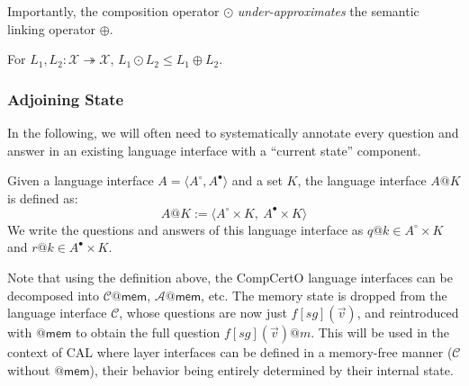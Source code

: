 \documentclass[acmsmall,screen,review,anonymous]{acmart}
\newcommand{\kw}[1]{\ensuremath{ \mathsf{#1} }}
\newcommand{\que}{\circ}
\newcommand{\ans}{\bullet}
\begin{document}
Importantly,
the composition operator $\odot$
\emph{under-approximates}
the semantic linking operator $\oplus$.

\begin{theorem}
For $L_1, L_2 : \mathcal{X} \twoheadrightarrow \mathcal{X}$,
$
  L_1 \odot L_2
  \le
  L_1 \oplus L_2
$.
\end{theorem}


\subsubsection{Adjoining State} %

In the following,
we will often need to systematically
annotate every question and answer
in an existing language interface
with a ``current state'' component.

\begin{definition}
Given a language interface $A = \langle A^\que, A^\ans \rangle$
and a set $K$,
the language interface $A@K$ is defined as:
\[
  A@K := \langle A^\que \times K ,\: A^\ans \times K \rangle
\]
We write the questions and answers of this language interface as
$q@k \in A^\que \times K$ and
$r@k \in A^\ans \times K$.
\end{definition}

Note that using the definition above,
the CompCertO language interfaces
can be decomposed into $\mathcal{C}@\kw{mem}$, $\mathcal{A}@\kw{mem}$, etc.
The memory state is dropped from the language interface $\mathcal{C}$,
whose questions are now just $f[\mathit{sg}](\vec{v})$,
and reintroduced with $@\kw{mem}$ to obtain
the full question $f[\mathit{sg}](\vec{v})@m$.
This will be used in the context of CAL
where layer interfaces can be defined in a memory-free manner
($\mathcal{C}$ without $@\kw{mem}$),
their behavior being entirely determined by their internal state.
\end{document}
